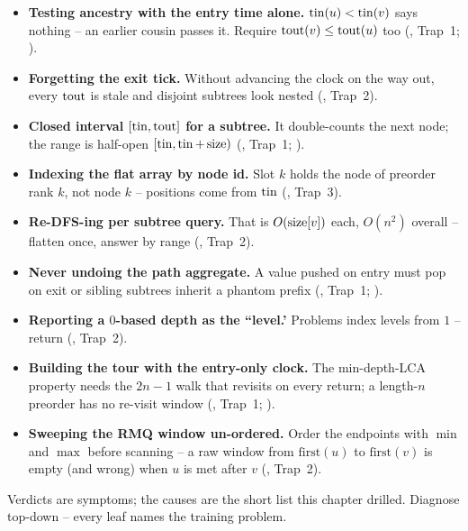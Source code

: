 \begin{itemize}[nosep, leftmargin=1.4em]
  \item \textbf{Testing ancestry with the entry time alone.} $\operatorname{tin}(u)<\operatorname{tin}(v)$ says nothing --
        an earlier cousin passes it. Require $\operatorname{tout}(v)\le\operatorname{tout}(u)$ too (,
        Trap~1; ).
  \item \textbf{Forgetting the exit tick.} Without advancing the clock on the way out, every
        $\operatorname{tout}$ is stale and disjoint subtrees look nested (, Trap~2).
  \item \textbf{Closed interval $[\operatorname{tin},\operatorname{tout}]$ for a subtree.} It double-counts the next node;
        the range is half-open $[\operatorname{tin},\operatorname{tin}{+}\operatorname{size})$ (, Trap~1;
        ).
  \item \textbf{Indexing the flat array by node id.} Slot $k$ holds the node of preorder rank
        $k$, not node $k$ -- positions come from $\operatorname{tin}$ (, Trap~3).
  \item \textbf{Re-DFS-ing per subtree query.} That is $O(\operatorname{size}[v])$ each, $O(n^2)$ overall --
        flatten once, answer by range (, Trap~2).
  \item \textbf{Never undoing the path aggregate.} A value pushed on entry must pop on exit or
        sibling subtrees inherit a phantom prefix (, Trap~1; ).
  \item \textbf{Reporting a $0$-based depth as the ``level.'} Problems index levels from $1$ --
        return  (, Trap~2).
  \item \textbf{Building the tour with the entry-only clock.} The min-depth-LCA property needs
        the $2n{-}1$ walk that revisits on every return; a length-$n$ preorder has no re-visit
        window (, Trap~1; ).
  \item \textbf{Sweeping the RMQ window un-ordered.} Order the endpoints with $\min$ and $\max$
        before scanning -- a raw window from $\mathrm{first}(u)$ to $\mathrm{first}(v)$ is empty
        (and wrong) when $u$ is met after $v$ (, Trap~2).
\end{itemize}


Verdicts are symptoms; the causes are the short list this chapter drilled. Diagnose
top-down -- every leaf names the training problem.

